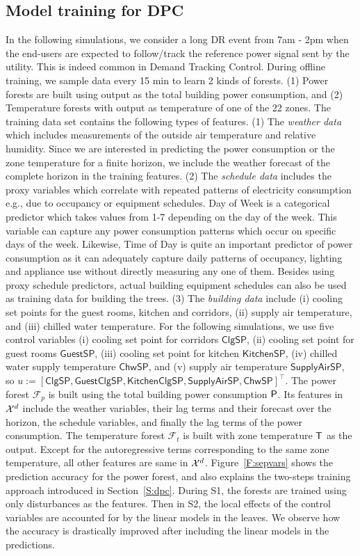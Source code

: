 \subsection{Model training for DPC}

In the following simulations, we consider a long DR event from 7am - 2pm when the end-users are expected to follow/track the reference power signal sent by the utility. This is indeed common in Demand Tracking Control. 
During offline training, we sample data every 15 min to learn 2 kinds of forests. (1) Power forests are built using output as the total building power consumption, and (2) Temperature forests with output as temperature of one of the 22 zones. 
The training data set contains the following types of features. (1) The \textit{weather data} which includes measurements of the outside air temperature and relative humidity. Since we are interested in predicting the power consumption or the zone temperature for a finite horizon, we include the weather forecast of the complete horizon in the training features. (2) The \textit{schedule data} includes the proxy variables which correlate with repeated patterns of electricity consumption e.g., due to occupancy or equipment schedules. Day of Week is a categorical predictor which takes values from 1-7 depending on the day of the week. This variable can capture any power consumption patterns which occur on specific days of the week. Likewise, Time of Day is quite an important predictor of power consumption as it can adequately capture daily patterns of occupancy, lighting and appliance use without directly measuring any one of them. Besides using proxy schedule predictors, actual building equipment schedules can also be used as training data for building the trees. (3) The \textit{building data} include (i) cooling set points for  the guest rooms, kitchen and corridors, (ii) supply air temperature, and (iii) chilled water temperature.
For the following simulations, we use five control variables (i) cooling set point for corridors $\mathsf{ClgSP}$, (ii) cooling set point for guest rooms $\mathsf{GuestSP}$, (iii) cooling set point for kitchen $\mathsf{KitchenSP}$, (iv) chilled water supply temperature $\mathsf{ChwSP}$, and (v) supply air temperature  $\mathsf{SupplyAirSP}$, so $u := [\mathsf{ClgSP},\mathsf{GuestClgSP},\mathsf{KitchenClgSP},\mathsf{SupplyAirSP}, \mathsf{ChwSP}]^\top$. 
The power forest $\mathcal{F}_p$ is built using the total building power consumption $\mathsf{P}$. Its features in $\mathcal{X}^d$ include the weather variables, their lag terms and their forecast over the horizon, the schedule variables, and finally the lag terms of the power consumption.
The temperature forest $\mathcal{F}_t$ is built with zone temperature $\mathsf{T}$ as the output. Except for the autoregressive terms corresponding to the same zone temperature, all other features are same in $\mathcal{X}^d$.
Figure~\ref{F:sepvars} shows the prediction accuracy for the power forest, and also explains the two-steps training approach introduced in Section~\ref{S:dpc}. During S1, the forests are trained using only disturbances as the features. Then in S2, the local effects of the control variables are accounted for by the linear models in the leaves. We observe how the accuracy is drastically improved after including the linear models in the predictions.

